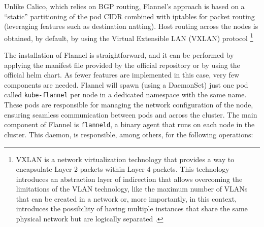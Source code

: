 Unlike Calico, which relies on BGP routing, Flannel's approach is based on a
``static'' partitioning of the pod CIDR combined with iptables for packet
routing (leveraging features such as destination natting). Host routing across
the nodes is obtained, by default, by using the Virtual Extensible LAN (VXLAN)
protocol \cite{flannel-github}\footnote{  VXLAN is a network virtualization
technology that provides a way to encapsulate Layer 2 packets within Layer 4
packets. This technology introduces an abstraction layer of indirection that
allows overcoming the limitations of the VLAN technology, like the maximum
number of VLANs that can be created in a network or, more importantly, in this
context, introduces the possibility of having multiple instances that share the
same physical network but are logically separated \cite{VXLANnistdef}.}




The installation of Flannel is straightforward, and it can be performed by
applying the manifest file provided by the official repository or by using the
official helm chart. As fewer features are implemented in this case, very few
components are needed. Flannel will spawn (using a DaemonSet) just one pod
called \texttt{kube-flannel} per node in a dedicated namespace with the same
name. These pods are responsible for managing the network configuration of the
node, ensuring seamless communication between pods and across the cluster. The
main component of Flannel is \texttt{flanneld}, a binary agent that runs on each
node in the cluster. This daemon, is responsible, among others, for the following
operations:

